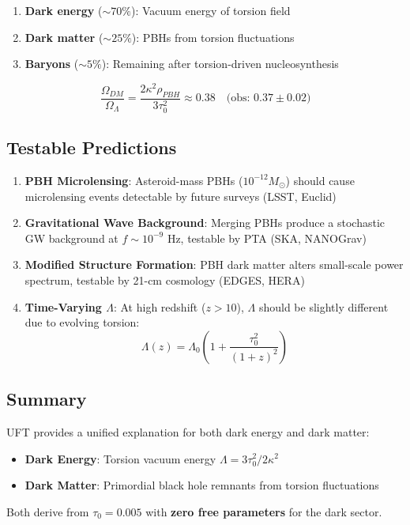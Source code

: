 \begin{enumerate}
    \item \textbf{Dark energy} ($\sim 70\%$): Vacuum energy of torsion field
    \item \textbf{Dark matter} ($\sim 25\%$): PBHs from torsion fluctuations
    \item \textbf{Baryons} ($\sim 5\%$): Remaining after torsion-driven nucleosynthesis
\end{enumerate}

\begin{equation}
    \frac{\Omega_{DM}}{\Omega_\Lambda} = \frac{2\kappa^2 \rho_{PBH}}{3\tau_0^2} \approx 0.38 \quad \text{(obs: } 0.37 \pm 0.02\text{)}
\end{equation}

\subsection{Testable Predictions}

\begin{enumerate}
    \item \textbf{PBH Microlensing}: Asteroid-mass PBHs ($10^{-12} M_\odot$) should cause microlensing events detectable by future surveys (LSST, Euclid)
    
    \item \textbf{Gravitational Wave Background}: Merging PBHs produce a stochastic GW background at $f \sim 10^{-9}$ Hz, testable by PTA (SKA, NANOGrav)
    
    \item \textbf{Modified Structure Formation}: PBH dark matter alters small-scale power spectrum, testable by 21-cm cosmology (EDGES, HERA)
    
    \item \textbf{Time-Varying $\Lambda$}: At high redshift ($z > 10$), $\Lambda$ should be slightly different due to evolving torsion:
    \begin{equation}
        \Lambda(z) = \Lambda_0 \left(1 + \frac{\tau_0^2}{(1+z)^2}\right)
    \end{equation}
\end{enumerate}

\subsection{Summary}

\begin{insight}
UFT provides a unified explanation for both dark energy and dark matter:
\begin{itemize}
    \item \textbf{Dark Energy}: Torsion vacuum energy $\Lambda = 3\tau_0^2/2\kappa^2$
    \item \textbf{Dark Matter}: Primordial black hole remnants from torsion fluctuations
\end{itemize}
Both derive from $\tau_0 = 0.005$ with \textbf{zero free parameters} for the dark sector.
\end{insight}

